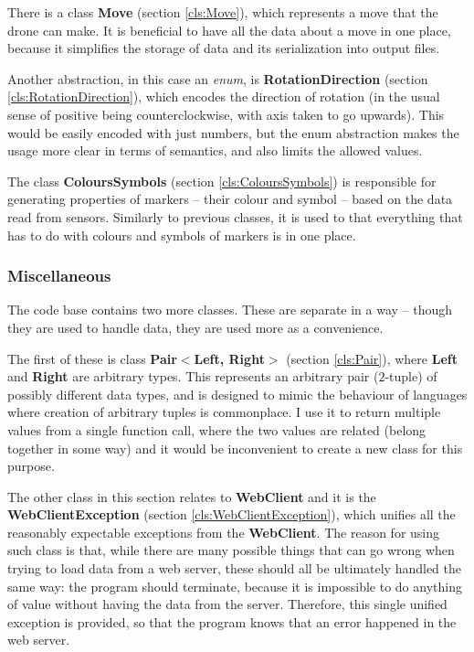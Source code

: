 \documentclass{article}
\newcommand{\sref}[1]{(section \ref{#1})}
\begin{document}
There is a class \textbf{Move} \sref{cls:Move}, which represents a move that the drone can make. It is beneficial to have all the data about a move in one place, because it simplifies the storage of data and its serialization into output files.

Another abstraction, in this case an \textit{enum}, is \textbf{RotationDirection} \sref{cls:RotationDirection}, which encodes the direction of rotation (in the usual sense of positive being counterclockwise, with axis taken to go upwards). This would be easily encoded with just numbers, but the enum abstraction makes the usage more clear in terms of semantics, and also limits the allowed values. 

The class \textbf{ColoursSymbols} \sref{cls:ColoursSymbols} is responsible for generating properties of markers -- their colour and symbol -- based on the data read from sensors. Similarly to previous classes, it is used to that everything that has to do with colours and symbols of markers is in one place.

\subsubsection{Miscellaneous}

The code base contains two more classes. These are separate in a way -- though they are used to handle data, they are used more as a convenience.

The first of these is class \textbf{Pair$<$Left, Right$>$} \sref{cls:Pair}, where \textbf{Left} and \textbf{Right} are arbitrary types. This represents an arbitrary pair ($2$-tuple) of possibly different data types, and is designed to mimic the behaviour of languages where creation of arbitrary tuples is commonplace. I use it to return multiple values from a single function call, where the two values are related (belong together in some way) and it would be inconvenient to create a new class for this purpose.

The other class in this section relates to \textbf{WebClient} and it is the \textbf{WebClientException} \sref{cls:WebClientException}, which unifies all the reasonably expectable exceptions from the \textbf{WebClient}. The reason for using such class is that, while there are many possible things that can go wrong when trying to load data from a web server, these should all be ultimately handled the same way: the program should terminate, because it is impossible to do anything of value without having the data from the server. Therefore, this single unified exception is provided, so that the program knows that an error happened in the web server.
\end{document}
